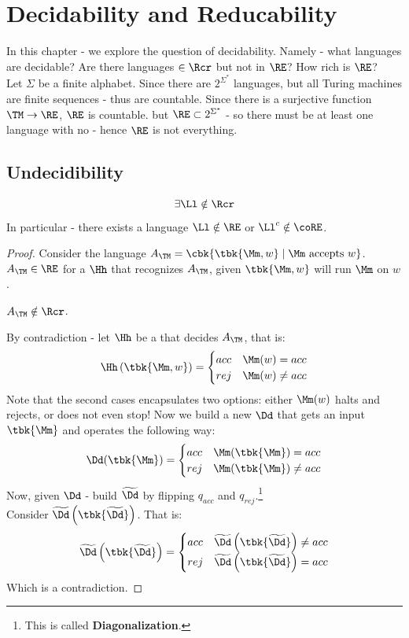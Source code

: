 \chapter{Decidability and Reducability}
In this chapter - we explore the question of decidability. Namely - what languages are decidable? Are there languages $\in \Rcr$ but not in $\RE$? How rich is $\RE$?\\
Let $\Sigma$ be a finite alphabet. Since there are $2^{\Sigma^*}$ languages, but all Turing machines are finite sequences - thus are countable. Since there is a surjective function $\TM\to \RE$, $\RE$ is countable. but $\RE\subset 2^{\Sigma^*}$ - so there must be at least one language with no \TM - hence $\RE$ is not everything.
\section{Undecidibility}
\begin{blueBox}
	\begin{thm}
		\[\exists \Ll\notin \Rcr\]
		In particular - there exists a language $\Ll\notin \RE$ or $\Ll^c\notin \coRE$.
	\end{thm}
\end{blueBox}
\begin{proof}
	Consider the language $A_{\TM} = \cbk{\tbk{\Mm,w}\mid \Mm\text{ accepts }w}$. $A_{\TM}\in \RE$ for a \TM $\Hh$ that recognizes $A_{\TM}$, given $\tbk{\Mm,w}$ will run $\Mm$ on $w$.
	\begin{claim}
		$A_{\TM}\notin \Rcr$.
	\end{claim}
	By contradiction - let $\Hh$ be a \TM that decides $A_{\TM}$, that is:
	\[
	\Hh\left(\tbk{\Mm,w}\right) = \begin{cases}
		acc & \Mm(w) = acc\\
		rej & \Mm(w)\neq acc
	\end{cases}
	\]
	Note that the second cases encapsulates two options: either $\Mm(w)$ halts and rejects, or does not even stop! Now we build a new \TM $\Dd$ that gets an input $\tbk{\Mm}$ and operates the following way:
	\[
	\Dd(\tbk{\Mm}) = \begin{cases}
		acc & \Mm(\tbk{\Mm}) = acc\\
		rej & \Mm(\tbk{\Mm}) \neq acc
	\end{cases}
	\]
	Now, given $\Dd$ - build $\widetilde{\Dd}$ by flipping $q_{acc}$ and $q_{rej}$.\footnote{This is called \textbf{Diagonalization}.}\\
	Consider $\widetilde{\Dd}\left(\tbk{\widetilde{\Dd}}\right)$. That is:
	\[
	\widetilde{\Dd}\left(\tbk{\widetilde{\Dd}}\right) = \begin{cases}
		acc & \widetilde{\Dd}\left(\tbk{\widetilde{\Dd}}\right) \neq acc\\
		rej & \widetilde{\Dd}\left(\tbk{\widetilde{\Dd}}\right) = acc
	\end{cases}
	\]
	Which is a contradiction.	
\end{proof}
